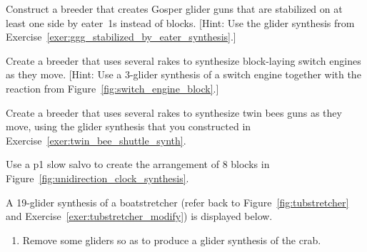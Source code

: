 \begin{multicols}{2}
	
	\mfilbreak
	
	
	\begin{problem}\label{exer:ggg_eater_side_breeder}
		Construct a breeder that creates Gosper glider guns that are stabilized on at least one side by eater~1s instead of blocks. [Hint: Use the glider synthesis from Exercise~\ref{exer:ggg_stabilized_by_eater_synthesis}.]
	\end{problem}
	
	
	\mfilbreak
	
	
	\begin{problem}\label{exer:block_laying_switch_breeder}
		Create a breeder that uses several rakes to synthesize block-laying switch engines as they move. [Hint: Use a $3$-glider synthesis of a switch engine together with the reaction from Figure~\ref{fig:switch_engine_block}.]
	\end{problem}
	
	
	\mfilbreak
	
	
	\begin{problem}\label{exer:new_gun_breeder}
		Create a breeder that uses several rakes to synthesize twin bees guns as they move, using the glider synthesis that you constructed in Exercise~\ref{exer:twin_bee_shuttle_synth}.
	\end{problem}
	
	
	\mfilbreak
	
	
	\begin{problem}\label{exer:slow_salvo_8_blocks}
		Use a p1 slow salvo to create the arrangement of $8$ blocks in Figure~\ref{fig:unidirection_clock_synthesis}.
	\end{problem}
	
	
	\mfilbreak
	
	
	\begin{problemstar}\label{exer:large_still_life_synth}
		A 19-glider synthesis of a boatstretcher (refer back to Figure~\ref{fig:tubstretcher} and Exercise~\ref{exer:tubstretcher_modify}) is displayed below.
		\begin{center}
		\end{center}
		\begin{enumerate}[label=\bf\color{ocre}(\alph*)]
			\item Remove some gliders so as to produce a glider synthesis of the crab.
			

\end{enumerate}
\end{problemstar}
\end{multicols}
